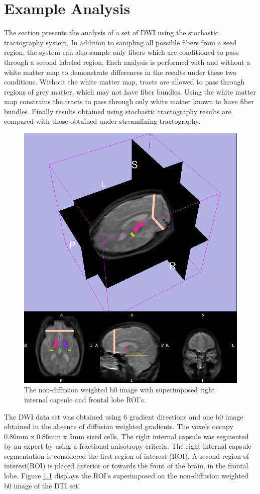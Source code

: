 \chapter{Example Analysis}
The section presents the analysis of a set of DWI using the stochastic tractography system.  In addition to sampling all possible fibers from a seed region, the system can also sample only fibers which are conditioned to pass through a second labeled region.  Each analysis is performed with and without a white matter map to demonstrate differences in the results under these two conditions.  Without the white matter map, tracts are allowed to pass through regions of grey matter, which may not have fiber bundles.  Using the white matter map constrains the tracts to pass through only white matter known to have fiber bundles.  Finally results obtained using stochastic tractography results are compared with those obtained under streamlining tractography.
\begin{figure}
\label{fig:labelmap}
  \center
	\includegraphics[width=0.5\linewidth]{slicer-0001}
	\caption{The non-diffusion weighted b0 image with superimposed right internal capsule and frontal lobe ROI's.}
\end{figure}
The DWI data set was obtained using 6 gradient directions and one b0 image obtained in the absence of diffusion weighted gradients.  The voxels occupy 0.86mm x 0.86mm x 5mm sized cells. The right internal capsule was segmented by an expert by using a fractional anisotropy criteria.  The right internal capsule segmentation is considered the first region of interest (ROI).  A second region of interest(ROI) is placed anterior or towards the front of the brain, in the frontal lobe.  Figure \ref{fig:labelmap} displays the ROI's superimposed on the non-diffusion weighted b0 image of the DTI set.


